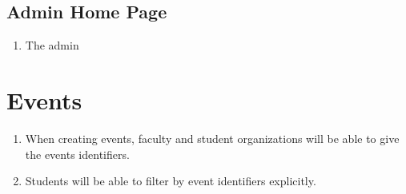 \documentclass{article}
\begin{document}
		\subsection{Admin Home Page}
			\begin{enumerate}[leftmargin=3\parindent]
				\item The admin 
			\end{enumerate}
\section{Events}
	\begin{enumerate}
		\item When creating events, faculty and student organizations will be able to give the events identifiers.
		\item Students will be able to filter by event identifiers explicitly.
	\end{enumerate}
\end{document}
